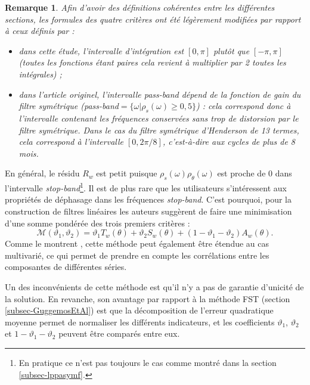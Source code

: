 \documentclass[
  12pt,
  french,
  12pt,a4paper]{article}
\newcommand\1{\mathds{1}}
\newtheorem*{remarque}{Remarque}
\begin{document}
\begin{remarque}

Afin d'avoir des définitions cohérentes entre les différentes sections, les formules des quatre critères ont été légèrement modifiées par rapport à ceux définis par \textcite{trilemmaWMR2019} :

\begin{itemize}
\item
  dans cette étude, l'intervalle d'intégration est \([0,\pi]\) plutôt que \([-\pi,\pi]\) (toutes les fonctions étant paires cela revient à multiplier par 2 toutes les intégrales) ;
\item
  dans l'article originel, l'intervalle pass-band dépend de la fonction de gain du filtre symétrique (pass-band\(=\{\omega |\rho_s(\omega)\geq 0,5\}\)) : cela correspond donc à l'intervalle contenant les fréquences conservées sans trop de distorsion par le filtre symétrique.
  Dans le cas du filtre symétrique d'Henderson de 13 termes, cela correspond à l'intervalle \([0, 2\pi/8]\), c'est-à-dire aux cycles de plus de 8 mois.
\end{itemize}

\end{remarque}

En général, le résidu \(R_w\) est petit puisque \(\rho_s(\omega)\rho_\theta(\omega)\) est proche de 0 dans l'intervalle \emph{stop-band}\footnote{
  En pratique ce n'est pas toujours le cas comme montré dans la section \ref{subsec-lppasymf}.}.
Il est de plus rare que les utilisateurs s'intéressent aux propriétés de déphasage dans les fréquences \emph{stop-band}.
C'est pourquoi, pour la construction de filtres linéaires les auteurs suggèrent de faire une minimisation d'une somme pondérée des trois premiers critères :
\[
\mathcal{M}(\vartheta_{1},\vartheta_{2})=\vartheta_{1}T_w(\theta)+\vartheta_{2}S_w(\theta)+(1-\vartheta_{1}-\vartheta_{2})A_w(\theta).
\]
Comme le montrent \textcite{tuckerwildi2020}, cette méthode peut également être étendue au cas multivarié, ce qui permet de prendre en compte les corrélations entre les composantes de différentes séries.

Un des inconvénients de cette méthode est qu'il n'y a pas de garantie d'unicité de la solution.
En revanche, son avantage par rapport à la méthode FST (section \ref{subsec-GuggemosEtAl}) est que la décomposition de l'erreur quadratique moyenne permet de normaliser les différents indicateurs, et les coefficients \(\vartheta_{1}\), \(\vartheta_{2}\) et \(1-\vartheta_{1}-\vartheta_{2}\) peuvent être comparés entre eux.
\end{document}
